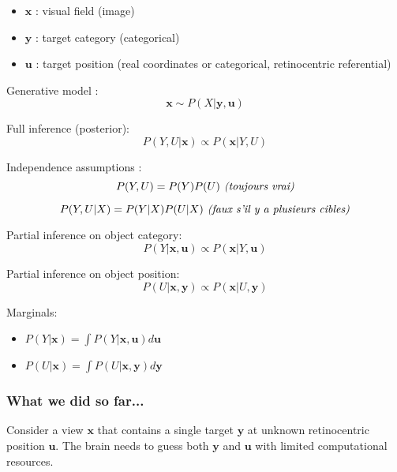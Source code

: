 \fi



\CNS

\begin{itemize}
	\item $\boldsymbol{x}$ : visual field (image)
	\item $\boldsymbol{y}$ : target category (categorical)
	\item $\boldsymbol{u}$ : target position (real coordinates or categorical, retinocentric referential)

\end{itemize}

Generative model :
$$ \boldsymbol{x} \sim P(X|\boldsymbol{y}, \boldsymbol{u}) $$

Full inference (posterior):
$$ P(Y, U|\boldsymbol{x}) \propto  P(\boldsymbol{x}|Y, U) $$

Independence assumptions :
\begin{equation} 
P(Y, U) = P(Y)  P(U) \text{\emph{ (toujours vrai)}}
\label{eq:indep-1}
\end{equation}

\begin{equation}  
P(Y, U|X) = P(Y|X)  P(U|X) \text{\emph{ (faux s'il y a plusieurs cibles)}}
\label{eq:indep-2}
\end{equation}

Partial inference on object category:
$$ P(Y|\boldsymbol{x}, \boldsymbol{u}) \propto  P(\boldsymbol{x}|Y, \boldsymbol{u}) $$

Partial inference on object position:
$$ P(U|\boldsymbol{x}, \boldsymbol{y}) \propto  P(\boldsymbol{x}|U, \boldsymbol{y}) $$

Marginals:
\begin{itemize}
\item $ P(Y|\boldsymbol{x}) = \int P(Y|\boldsymbol{x}, \boldsymbol{u}) d\boldsymbol{u}$
\item $ P(U|\boldsymbol{x}) = \int P(U|\boldsymbol{x}, \boldsymbol{y}) d\boldsymbol{y}$
\end{itemize}

\subsubsection{What we did so far...}

Consider a view $\boldsymbol{x}$ that contains a single target $\boldsymbol{y}$ at unknown retinocentric position $\boldsymbol{u}$. The brain needs to guess both  $\boldsymbol{y}$ and $\boldsymbol{u}$ with limited computational resources. 
   
